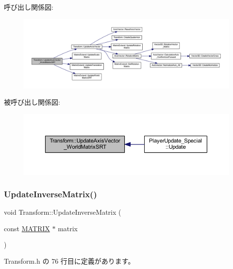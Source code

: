 呼び出し関係図\+:\nopagebreak
\begin{figure}[H]
\begin{center}
\leavevmode
\includegraphics[width=350pt]{class_transform_af02515be1947506212ca1c23223ce0b3_cgraph}
\end{center}
\end{figure}
被呼び出し関係図\+:\nopagebreak
\begin{figure}[H]
\begin{center}
\leavevmode
\includegraphics[width=350pt]{class_transform_af02515be1947506212ca1c23223ce0b3_icgraph}
\end{center}
\end{figure}
\mbox{\label{class_transform_a3d2e5da24fb1c8015f5bb9a6c0a7a7de}} 
\subsubsection{\texorpdfstring{Update\+Inverse\+Matrix()}{UpdateInverseMatrix()}}
{\footnotesize\ttfamily void Transform\+::\+Update\+Inverse\+Matrix (\begin{DoxyParamCaption}\item[{const \mbox{\hyperlink{_vector3_d_8h_a032295cd9fb1b711757c90667278e744}{M\+A\+T\+R\+IX}} $\ast$}]{matrix }\end{DoxyParamCaption})\hspace{0.3cm}{\ttfamily [inline]}}



 Transform.\+h の 76 行目に定義があります。

